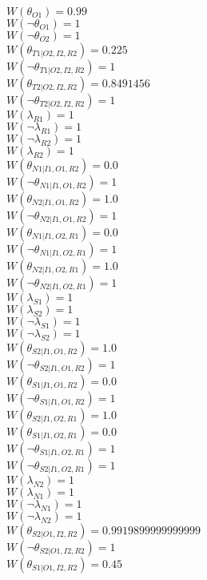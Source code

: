 $W(\theta_{O1})=0.99$\\
$W(\neg\theta_{O1})=1$\\
$W(\neg\theta_{O2})=1$\\
$W(\theta_{T1|O2,I2,R2})=0.225$\\
$W(\neg\theta_{T1|O2,I2,R2})=1$\\
$W(\theta_{T2|O2,I2,R2})=0.8491456$\\
$W(\neg\theta_{T2|O2,I2,R2})=1$\\
$W(\lambda_{R1})=1$\\
$W(\neg\lambda_{R1})=1$\\
$W(\neg\lambda_{R2})=1$\\
$W(\lambda_{R2})=1$\\
$W(\theta_{N1|I1,O1,R2})=0.0$\\
$W(\neg\theta_{N1|I1,O1,R2})=1$\\
$W(\theta_{N2|I1,O1,R2})=1.0$\\
$W(\neg\theta_{N2|I1,O1,R2})=1$\\
$W(\theta_{N1|I1,O2,R1})=0.0$\\
$W(\neg\theta_{N1|I1,O2,R1})=1$\\
$W(\theta_{N2|I1,O2,R1})=1.0$\\
$W(\neg\theta_{N2|I1,O2,R1})=1$\\
$W(\lambda_{S1})=1$\\
$W(\lambda_{S2})=1$\\
$W(\neg\lambda_{S1})=1$\\
$W(\neg\lambda_{S2})=1$\\
$W(\theta_{S2|I1,O1,R2})=1.0$\\
$W(\neg\theta_{S2|I1,O1,R2})=1$\\
$W(\theta_{S1|I1,O1,R2})=0.0$\\
$W(\neg\theta_{S1|I1,O1,R2})=1$\\
$W(\theta_{S2|I1,O2,R1})=1.0$\\
$W(\theta_{S1|I1,O2,R1})=0.0$\\
$W(\neg\theta_{S1|I1,O2,R1})=1$\\
$W(\neg\theta_{S2|I1,O2,R1})=1$\\
$W(\lambda_{N2})=1$\\
$W(\lambda_{N1})=1$\\
$W(\neg\lambda_{N1})=1$\\
$W(\neg\lambda_{N2})=1$\\
$W(\theta_{S2|O1,I2,R2})=0.9919899999999999$\\
$W(\neg\theta_{S2|O1,I2,R2})=1$\\
$W(\theta_{S1|O1,I2,R2})=0.45$\\
